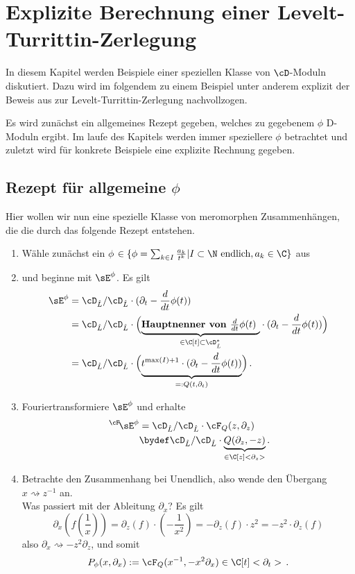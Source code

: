 \chapter{Explizite Berechnung einer Levelt-\!Turrittin-Zerlegung}
In diesem Kapitel werden Beispiele einer speziellen Klasse von $\cD$-Moduln
diskutiert. Dazu wird im folgendem zu einem Beispiel unter anderem explizit der
Beweis aus \cite{sabbah_cimpa90} zur Levelt-Turrittin-Zerlegung nachvollzogen.

Es wird zunächst ein allgemeines Rezept gegeben, welches zu gegebenem $\phi$
D-Moduln ergibt. Im laufe des Kapitels werden immer speziellere $\phi$
betrachtet und zuletzt wird für konkrete Beispiele eine explizite Rechnung
gegeben.

\section{Rezept für allgemeine $\phi$} \label{sec:allgemeinProblem}
Hier wollen wir nun eine spezielle Klasse von meromorphen Zusammenhängen, die
die durch das folgende Rezept entstehen.
\begin{enumerate}
\item Wähle zunächst ein $\phi$
$\in\{\phi=\sum_{k\in I}\frac{a_k}{t^{k}}|I\subset\N\mbox{ endlich}
,a_k\in \C\}$
aus
\item und beginne mit $\sE^{\phi}$. Es gilt
\begin{align*}
\sE^{\phi} &= \cD_{\hat L}/\cD_{\hat L}\cdot (\partial_t-\frac{d}{dt}\phi(t))
\\&=\cD_{\hat L}/\cD_{\hat L}\cdot \Big(\underset{\in\C[t]\subset\cD_{\hat L}^*}
    {\underbrace{\mbox{\textbf{Hauptnenner von $\frac{d}{dt}\phi(t)$ }}}}
  \cdot (\partial_t-\frac{d}{dt}\phi(t))\Big)
\\&=\cD_{\hat L}/\cD_{\hat L}\cdot \Big(
  \underset{=:Q(t,\partial_t)}{\underbrace{
  t^{\max(I)+1} \cdot (\partial_t-\frac{d}{dt}\phi(t))}}\Big) \,.
\end{align*}
\begin{comment}
Dies ändert den meromorphen Zusammenhang nicht, weil $t^{\max(I)+1}$ eine
Einheit in $\cD_{\hat L}$ (und auch in $\cD_{L}$) ist.
\end{comment}
\item Fouriertransformiere $\sE^{\phi}$ und erhalte
\begin{align*}
\,^\cF\!\sE^{\phi}&=\cD_{\hat L}/\cD_{\hat L}\cdot{\cF_Q(z,\partial_z)}
\\&\bydef \cD_{\hat L}/\cD_{\hat L}\cdot
  \underset{\in\C[z]<\partial_z>}{\underbrace{Q(\partial_z,-z)}} \,.
\end{align*}
\item Betrachte den Zusammenhang bei Unendlich, also wende den Übergang
$x\rightsquigarrow z^{-1}$ an.\\
Was passiert mit der Ableitung $\partial_x$?
Es gilt
\[
\partial_x (f(\frac{1}{x}))=
\partial_z(f)\cdot (-\frac{1}{x^2})=
-\partial_z(f)\cdot z^2= %
- z^2 \cdot \partial_z(f)
\]
also $ \partial_x\rightsquigarrow-z^2\partial_z $, und somit
\[
P_\phi(x,\partial_x):=\cF_Q(x^{-1},-x^2\partial_x) \in \C[t]<\partial_t> \,.
\]
\end{enumerate}
